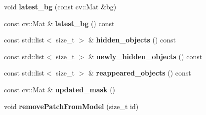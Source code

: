 \begin{DoxyCompactItemize}
\item 
\hypertarget{classskl_1_1_patch_model_a431184dc94a7f189db4b33d7f7f1d768}{}\label{classskl_1_1_patch_model_a431184dc94a7f189db4b33d7f7f1d768} 
void {\bfseries latest\+\_\+bg} (const cv\+::\+Mat \&bg)
\item 
\hypertarget{classskl_1_1_patch_model_a8264c3659b3ea8ff56024a3e1f308395}{}\label{classskl_1_1_patch_model_a8264c3659b3ea8ff56024a3e1f308395} 
const cv\+::\+Mat \& {\bfseries latest\+\_\+bg} () const
\item 
\hypertarget{classskl_1_1_patch_model_ad11cc2666d1bb775c9c7da34431d3853}{}\label{classskl_1_1_patch_model_ad11cc2666d1bb775c9c7da34431d3853} 
const std\+::list$<$ size\+\_\+t $>$ \& {\bfseries hidden\+\_\+objects} () const
\item 
\hypertarget{classskl_1_1_patch_model_accefbe2067c2c8c29fb5d989709f7be4}{}\label{classskl_1_1_patch_model_accefbe2067c2c8c29fb5d989709f7be4} 
const std\+::list$<$ size\+\_\+t $>$ \& {\bfseries newly\+\_\+hidden\+\_\+objects} () const
\item 
\hypertarget{classskl_1_1_patch_model_ae4bc12f861ba1ad21ef7966771f43d4a}{}\label{classskl_1_1_patch_model_ae4bc12f861ba1ad21ef7966771f43d4a} 
const std\+::list$<$ size\+\_\+t $>$ \& {\bfseries reappeared\+\_\+objects} () const
\item 
\hypertarget{classskl_1_1_patch_model_a9ea1281d94017e968185493bc7551e42}{}\label{classskl_1_1_patch_model_a9ea1281d94017e968185493bc7551e42} 
const cv\+::\+Mat \& {\bfseries updated\+\_\+mask} ()
\item 
\hypertarget{classskl_1_1_patch_model_a60c6fc2c551f5653d54c1ba625653524}{}\label{classskl_1_1_patch_model_a60c6fc2c551f5653d54c1ba625653524} 
void {\bfseries remove\+Patch\+From\+Model} (size\+\_\+t id)
\end{DoxyCompactItemize}
